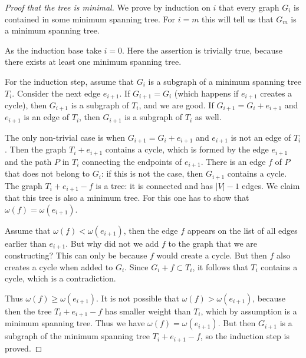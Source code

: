 \begin{proof}[Proof that the tree is minimal]
We prove by induction on $i$ that every graph $G_i$ is contained in some minimum spanning tree.
For $i=m$ this will tell us that $G_m$ is a minimum spanning tree.

As the induction base take $i=0$.
Here the assertion is trivially true, because there exists at least one minimum spanning tree.

For the induction step, assume that $G_i$ is a subgraph of a minimum spanning tree $T_i$.
Consider the next edge $e_{i+1}$.
If $G_{i+1} = G_i$ (which happens if $e_{i+1}$ creates a cycle), then $G_{i+1}$ is a subgraph of $T_i$, and we are good.
If $G_{i+1} = G_i + e_{i+1}$ and $e_{i+1}$ is an edge of $T_i$, then $G_{i+1}$ is a subgraph of $T_i$ as well.

The only non-trivial case is when $G_{i+1} = G_i + e_{i+1}$ and $e_{i+1}$ is not an edge of $T_i$.
Then the graph $T_i + e_{i+1}$ contains a cycle,
which is formed by the edge $e_{i+1}$ and the path $P$ in $T_i$ connecting the endpoints of $e_{i+1}$.
There is an edge $f$ of $P$ that does not belong to $G_i$: if this is not the case, then $G_{i+1}$ contains a cycle.
The graph $T_i + e_{i+1} - f$ is a tree: it is connected and has $|V|-1$ edges.
We claim that this tree is also a minimum tree.
For this one has to show that $\omega(f) = \omega(e_{i+1})$.

Assume that $\omega(f) < \omega(e_{i+1})$, then the edge $f$ appears on the list of all edges earlier than $e_{i+1}$.
But why did not we add $f$ to the graph that we are constructing?
This can only be because $f$ would create a cycle.
But then $f$ also creates a cycle when added to $G_i$.
Since $G_i + f \subset T_i$, it follows that $T_i$ contains a cycle, which is a contradiction.

Thus $\omega(f) \ge \omega(e_{i+1})$.
It is not possible that $\omega(f) > \omega(e_{i+1})$, because then the tree $T_i + e_{i+1} - f$ has smaller weight than $T_i$,
which by assumption is a minimum spanning tree.
Thus we have $\omega(f) = \omega(e_{i+1})$.
But then $G_{i+1}$ is a subgraph of the minimum spanning tree $T_i + e_{i+1} - f$, so the induction step is proved.
\end{proof}




